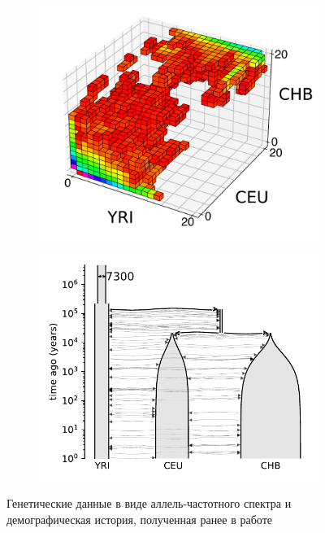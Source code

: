 \begin{figure}[ht]
    \centering
    \begin{subfigure}[b]{0.4\linewidth}
        \centering
        \includegraphics[width=\textwidth]{images_experiments/3pop_human_gutenkunst/3d_plot_fixed.pdf}
        \caption{}
        \label{fig:part4:experiments:3pop_human:data}
    \end{subfigure}
    \begin{subfigure}[b]{0.59\linewidth}
        \centering
        \includegraphics[width=\textwidth]{images_experiments/3pop_human_gutenkunst/picture_3pop_guten.pdf}
        \caption{}
        \label{fig:part4:experiments:3pop_human:model}
    \end{subfigure}
    \caption{Генетические данные в виде аллель-частотного спектра и демографическая история, полученная ранее в работе~\cite{gutenkunst2009inferring}}
    \label{fig:part4:experiments:3pop_human:data_and_model}
\end{figure}

